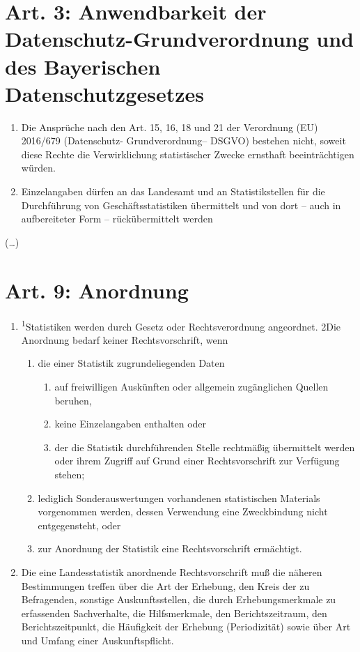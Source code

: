 \documentclass[12pt]{scrbook}
\begin{document}
    \section[Art. 3: EU-DSGVO und BayDatSchG]{Art. 3: Anwendbarkeit der Datenschutz-Grundverordnung und des Bayerischen Datenschutzgesetzes}
        \begin{enumerate}[label=(\arabic*)]
            \item Die Ansprüche nach den Art. 15, 16, 18 und 21 der Verordnung (EU) 2016/679 (Datenschutz- Grundverordnung– DSGVO) bestehen nicht, soweit diese Rechte die Verwirklichung statistischer Zwecke ernsthaft beeinträchtigen würden.
            \item Einzelangaben dürfen an das Landesamt und an Statistikstellen für die Durchführung von Geschäftsstatistiken übermittelt und von dort – auch in aufbereiteter Form – rückübermittelt werden
        \end{enumerate}
    (\dots)
    \section{Art. 9: Anordnung}
        \begin{enumerate}[label=(\arabic*)]
            \item \textsuperscript{1}Statistiken werden durch Gesetz oder Rechtsverordnung angeordnet. 2Die Anordnung bedarf keiner Rechtsvorschrift, wenn
            \begin{enumerate}[label=\arabic*.]
                \item die einer Statistik zugrundeliegenden Daten
                    \begin{enumerate}[label=(\alph*)]
                        \item auf freiwilligen Auskünften oder allgemein zugänglichen Quellen beruhen,
                        \item keine Einzelangaben enthalten oder
                        \item der die Statistik durchführenden Stelle rechtmäßig übermittelt werden oder ihrem Zugriff auf Grund einer Rechtsvorschrift zur Verfügung stehen;
                    \end{enumerate}
                \item lediglich Sonderauswertungen vorhandenen statistischen Materials vorgenommen werden, dessen Verwendung eine Zweckbindung nicht entgegensteht, oder
                \item zur Anordnung der Statistik eine Rechtsvorschrift ermächtigt.
            \end{enumerate}
            \item Die eine Landesstatistik anordnende Rechtsvorschrift muß die näheren Bestimmungen treffen über die Art der Erhebung, den Kreis der zu Befragenden, sonstige Auskunftsstellen, die durch Erhebungsmerkmale zu erfassenden Sachverhalte, die Hilfsmerkmale, den Berichtszeitraum, den Berichtszeitpunkt, die Häufigkeit der Erhebung (Periodizität) sowie über Art und Umfang einer Auskunftspflicht.
        \end{enumerate}
\end{document}
